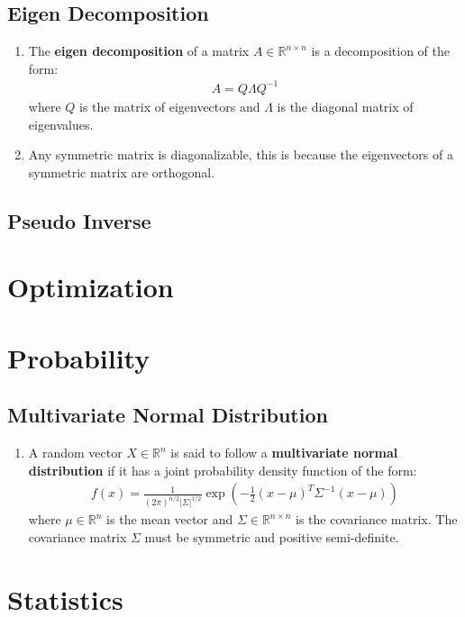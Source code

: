 \documentclass[letterpaper, 11pt]{article}
\newcommand{\R}{\mathbb{R}}	%
\newcommand{\1}{\mathds{1}}	%
\theoremstyle{definition}
\begin{document}
\subsection{Eigen Decomposition}
\begin{enumerate}
    \item The \textbf{eigen decomposition} of a matrix $A \in \R^{n \times n}$ is a decomposition of the form:
    \begin{align}
        A = Q \Lambda Q^{-1}
    \end{align}
    where $Q$ is the matrix of eigenvectors and $\Lambda$ is the diagonal matrix of eigenvalues.
    \item Any symmetric matrix is diagonalizable, this is because the eigenvectors of a symmetric matrix are orthogonal.
\end{enumerate}

\subsection{Pseudo Inverse}

\section{Optimization}

\section{Probability}
\subsection{Multivariate Normal Distribution}
\begin{enumerate}
    \item A random vector $X \in \R^n$ is said to follow a \textbf{multivariate normal distribution} if it has a joint probability density function of the form:
    \begin{align}
        f(x) = \frac{1}{(2\pi)^{n/2} |\Sigma|^{1/2}} \exp\left(-\frac{1}{2} (x - \mu)^T \Sigma^{-1} (x - \mu)\right)
    \end{align}
    where $\mu \in \R^n$ is the mean vector and $\Sigma \in \R^{n \times n}$ is the covariance matrix. The covariance matrix $\Sigma$ must be symmetric and positive semi-definite.
\end{enumerate}

\section{Statistics}
\end{document}
